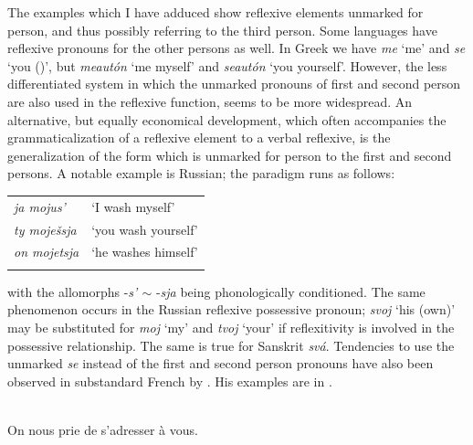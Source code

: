 The examples which I have adduced show reflexive elements unmarked for person, and thus possibly referring to the third person. Some languages have reflexive pronouns for the other persons as well. In Greek we have \textit{me} ‘me’ and \textit{se} ‘you (\glacc)’, but \textit{meautón} ‘me myself’ and \textit{seautón} ‘you yourself’. However, the less differentiated system in which the unmarked pronouns of first and second person are also used in the reflexive function, seems to be more widespread. An alternative, but equally economical development, which often accompanies the grammaticalization of a reflexive element to a verbal reflexive, is the generalization of the form which is unmarked for person to the first and second persons. A notable example is Russian; the paradigm runs as follows:

\begin{table}
\begin{tabular}{ll}
\lsptoprule

\itshape ja mojus' & ‘I wash myself’\\
\itshape ty moješsja & ‘you wash yourself’\\
\itshape on mojetsja & ‘he washes himself’\\
\lspbottomrule
\end{tabular}
\end{table}

\noindent with the allomorphs -\textit{s' ${\sim}$} -\textit{sja} being phonologically conditioned. The same phenomenon occurs in the Russian reflexive possessive pronoun; \textit{svoj} ‘his (own)’ may be substituted for \textit{moj} ‘my’ and \textit{tvoj} ‘your’ if reflexitivity is involved in the possessive relationship. The same is true for Sanskrit \textit{svá}. Tendencies to use the unmarked \textit{se} instead of the first and second person pronouns have also been observed in substandard %
 French by \citet[147]{Frei1929}. His examples are in .

\ea\label{ex:E21}
\langinfo{\LangFren}{}{} \\
 \ea  On nous prie de s'adresser à vous.

